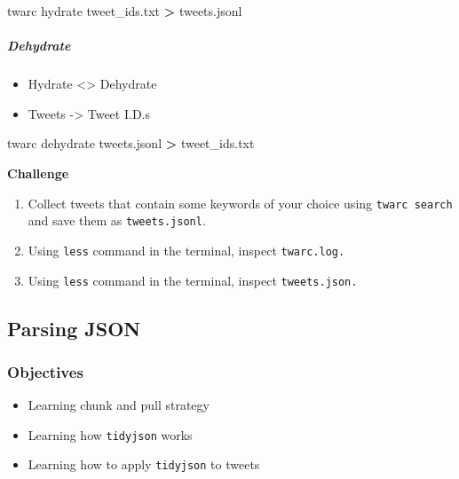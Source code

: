 \documentclass[
]{book}
\newenvironment{Shaded}{\begin{snugshade}}{\end{snugshade}}
\newcommand{\ExtensionTok}[1]{#1}
\newcommand{\NormalTok}[1]{#1}
\newcommand{\OperatorTok}[1]{\textcolor[rgb]{0.81,0.36,0.00}{\textbf{#1}}}
\providecommand{\tightlist}{%
  \setlength{\itemsep}{0pt}\setlength{\parskip}{0pt}}
\begin{document}
\begin{Shaded}
\begin{Highlighting}[]
\ExtensionTok{twarc}\NormalTok{ hydrate tweet\_ids.txt }\OperatorTok{\textgreater{}}\NormalTok{ tweets.jsonl }
\end{Highlighting}
\end{Shaded}

\hypertarget{dehydrate}{%
\subparagraph{Dehydrate}\label{dehydrate}}

\begin{itemize}
\tightlist
\item
  Hydrate \textless\textgreater{} Dehydrate
\item
  Tweets -\textgreater{} Tweet I.D.s
\end{itemize}

\begin{Shaded}
\begin{Highlighting}[]
\ExtensionTok{twarc}\NormalTok{ dehydrate tweets.jsonl }\OperatorTok{\textgreater{}}\NormalTok{ tweet\_ids.txt}
\end{Highlighting}
\end{Shaded}

\textbf{Challenge}

\begin{enumerate}
\def\labelenumi{\arabic{enumi}.}
\item
  Collect tweets that contain some keywords of your choice using \texttt{twarc\ search} and save them as \texttt{tweets.jsonl}.
\item
  Using \texttt{less} command in the terminal, inspect \texttt{twarc.log.}
\item
  Using \texttt{less} command in the terminal, inspect \texttt{tweets.json.}
\end{enumerate}

\hypertarget{parsing-json}{%
\subsection{Parsing JSON}\label{parsing-json}}

\hypertarget{objectives-6}{%
\subsubsection{Objectives}\label{objectives-6}}

\begin{itemize}
\tightlist
\item
  Learning chunk and pull strategy
\item
  Learning how \texttt{tidyjson} works
\item
  Learning how to apply \texttt{tidyjson} to tweets
\end{itemize}
\end{document}
